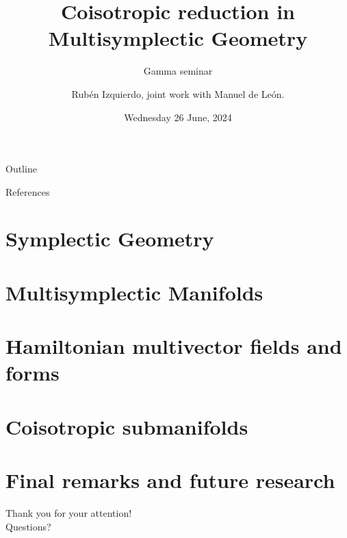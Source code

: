 \documentclass[9pt]{beamer}
\title{Coisotropic reduction in Multisymplectic Geometry}
\subtitle{Gamma seminar}
\author{Rubén Izquierdo, joint work with Manuel de León.}
\institute{ICMAT}
\date{Wednesday 26 June, 2024}
\theoremstyle{plain} %
\theoremstyle{definition} %
\begin{document}
\begin{frame}[plain]
    \titlepage
\end{frame}

\begin{frame}{Outline}
    \tableofcontents
\end{frame}



%
\nocite{deleón2024coisotropic}
\nocite{HamiltonianStructuresIbort}
\nocite{Ibort1999OnTG}
\nocite{deleon2003tulczyjews}
\begin{frame}{References}
    \printbibliography
\end{frame}


\section{Symplectic Geometry}


\section{Multisymplectic Manifolds}


\section{Hamiltonian multivector fields and forms}


\section{Coisotropic submanifolds}


\section{Final remarks and future research}




\begin{frame}
\begin{center}
    {\Huge Thank you for your attention!}\\
    \vspace{1 cm}
    {\Huge Questions?}
\end{center}
\end{frame}
\end{document}
